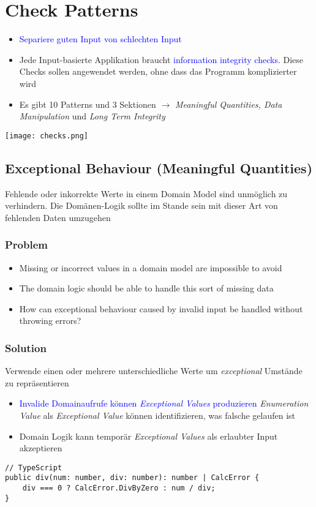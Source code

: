 \section{Check Patterns}

\begin{itemize}
    \item \textcolor{blue}{Separiere guten Input von schlechten Input}
    \item Jede Input-basierte Applikation braucht \textcolor{blue}{information integrity checks}. Diese Checks sollen angewendet werden, ohne dass das Programm komplizierter wird
    \item Es gibt 10 Patterns und 3 Sektionen $\rightarrow$ \textit{Meaningful Quantities, Data Manipulation} und \textit{Long Term Integrity}
\end{itemize}

\texttt{[image: checks.png]}

\subsection{Exceptional Behaviour (Meaningful Quantities)}

Fehlende oder inkorrekte Werte in einem Domain Model sind unmöglich zu verhindern. Die Domänen-Logik
sollte im Stande sein mit dieser Art von fehlenden Daten umzugehen

\subsubsection{Problem}
\begin{itemize}
    \item Missing or incorrect values in a domain model are impossible to avoid
    \item The domain logic should be able to handle this sort of missing data
    \item How can exceptional behaviour caused by invalid input be handled without throwing errors?
\end{itemize}
\subsubsection{Solution}
Verwende einen oder mehrere unterschiedliche Werte um \textit{exceptional} Umstände zu repräsentieren

\begin{itemize}
    \item \textcolor{blue}{Invalide Domainaufrufe können \textit{Exceptional Values} produzieren} \textit{Enumeration Value} als \textit{Exceptional Value} können identifizieren, was falsche gelaufen ist
    \item Domain Logik kann temporär \textit{Exceptional Values} als erlaubter Input akzeptieren
\end{itemize}
\begin{lstlisting}
// TypeScript
public div(num: number, div: number): number | CalcError {
    div === 0 ? CalcError.DivByZero : num / div;
}
\end{lstlisting}

